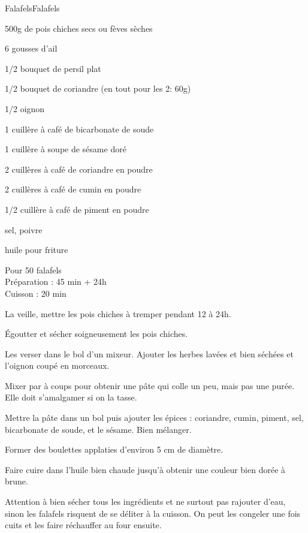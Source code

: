 \begin{recette}{Falafels}{Falafels}

\begin{ingredients}
500g de pois chiches secs ou fèves sèches\par
6 gousses d'ail\par
1/2 bouquet de persil plat\par
1/2 bouquet de coriandre (en tout pour les 2: 60g)\par
1/2 oignon\par
1 cuillère à café de bicarbonate de soude\par
1 cuillère à soupe de sésame doré\par
2 cuillères à café de coriandre en poudre\par
2 cuillères à café de cumin en poudre\par
1/2 cuillère à café de piment en poudre\par
sel, poivre\par
huile pour friture\par
\end{ingredients}

\begin{infos}
Pour 50 falafels\\
Préparation : 45 min + 24h\\
Cuisson : 20 min\\
\end{infos}

\begin{etapes}
\item La veille, mettre les pois chiches à tremper pendant 12 à 24h.
\item Égoutter et sécher soigneusement les pois chiches.
\item Les verser dans le bol d'un mixeur. Ajouter les herbes lavées et bien séchées et l'oignon coupé en morceaux.
\item Mixer par à coups pour obtenir une pâte qui colle un peu, mais pas une purée. Elle doit s'amalgamer si on la tasse.
\item Mettre la pâte dans un bol puis ajouter les épices : coriandre, cumin, piment, sel, bicarbonate de soude, et le sésame. Bien mélanger.
\item Former des boulettes applaties d'environ 5 cm de diamètre.
\item Faire cuire dans l'huile bien chaude jusqu'à obtenir une couleur bien dorée à brune.
\end{etapes}

\begin{conseils}
Attention à bien sécher tous les ingrédients et ne surtout pas rajouter d'eau, sinon les falafels risquent de se déliter à la cuisson.
On peut les congeler une fois cuits et les faire réchauffer au four ensuite.
\end{conseils}

\end{recette}